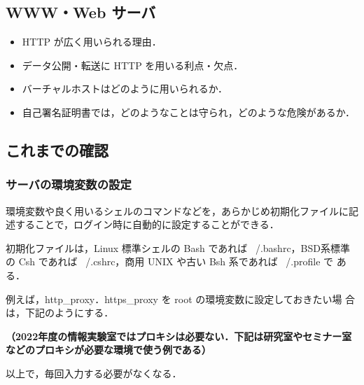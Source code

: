 \subsection*{WWW・Web サーバ}

\begin{itemize}
 \item HTTP が広く用いられる理由．
 \item データ公開・転送に HTTP を用いる利点・欠点．
 \item バーチャルホストはどのように用いられるか．
 \item 自己署名証明書では，どのようなことは守られ，どのような危険があるか．
\end{itemize}

\clearpage

\subsection*{これまでの確認}

\subsubsection*{サーバの環境変数の設定}

環境変数や良く用いるシェルのコマンドなどを，あらかじめ初期化ファイルに記
述することで，ログイン時に自動的に設定することができる．

初期化ファイルは，Linux 標準シェルの Bash であれば ~/.bashrc，BSD系標準
の Csh であれば ~/.cshrc，商用 UNIX や古い Bsh 系であれば ~/.profile で
ある．

例えば，http\_proxy．https\_proxy を root の環境変数に設定しておきたい場
合は，下記のようにする．

\textbf{（2022年度の情報実験室ではプロキシは必要ない．下記は研究室やセミナー室などのプロキシが必要な環境で使う例である）}


以上で，毎回入力する必要がなくなる．
